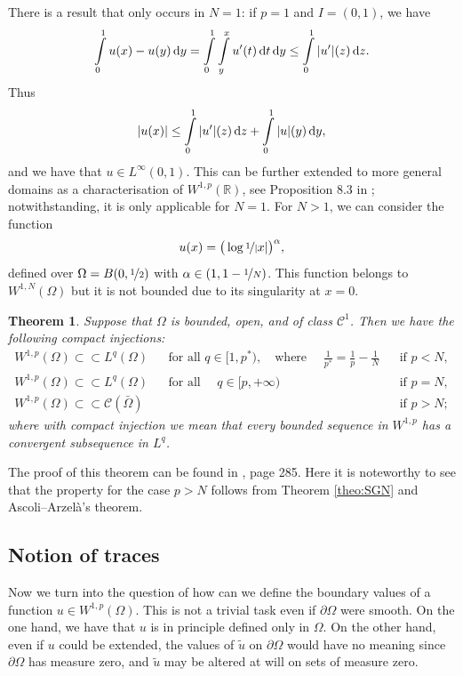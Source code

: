 \documentclass[a4paper,doc,11pt]{article}
\newtheorem{theorem}{Theorem}[section]
\newcommand{\R}{\mathbb{R}}
\newcommand{\CC}{\mathcal{C}}
\begin{document}
There is a result that only occurs in \(N=1\): if \(p=1\) and \( I = (0,1) \), we have
\[
    \int\limits_0^1 u(x) - u(y) \dif y = \int\limits_0^1 \int\limits_y^x u'(t) \dif t \dif y \leq \int\limits_0^1 |u'|(z) \dif z.
\]
Thus 
\[
    |u(x)| \leq \int\limits_0^1 |u'|(z) \dif z + \int\limits_0^1 |u|(y) \dif y,
\]
and we have that \( u \in L^\infty (0,1)\). This can be further extended to more general domains as a characterisation of \( W^{1,p} (\R)\), see Proposition 8.3 in \citep{Brezis2010}; notwithstanding, it is only applicable for \(N=1\). For \(N > 1\), we can consider the function 
\[
    u(x) = \big( \log \nicefrac 1 |x| \big)^\alpha,
\]
defined over \( \Omega = B(0,\nicefrac 1 2)\) with \( \alpha \in (1,1-\nicefrac 1 N)\). This function belongs to \( W^{1,N}(\Omega)\) but it is not bounded due to its singularity at \( x=0\).

\begin{theorem}
    Suppose that \(\Omega\) is bounded, open, and of class \(\CC^1\). Then we have the following compact injections:
    \begin{align}
        W^{1,p} (\Omega) \subset\subset L^{q} (\Omega) && \text{for all } q\in [1,p^*),\quad    \text{where } \quad\frac{1}{p^*} = \frac{1}{p} - \frac{1}{N} && \text{if } p < N,
        \\
        W^{1,p} (\Omega) \subset\subset L^{q} (\Omega) && \text{for all } \quad q \in [p,+\infty) && \text{if } p = N,
        \\
        W^{1,p} (\Omega) \subset\subset \CC  (\bar \Omega) &&  && \text{if } p > N;
    \end{align}
    where with compact injection we mean that every bounded sequence in \(W^{1,p}\) has a convergent subsequence in \(L^q\).
\end{theorem}

The proof of this theorem can be found in \citep{Brezis2010}, page 285. Here it is noteworthy to see that the property for the case \( p > N\) follows from Theorem \ref{theo:SGN} and Ascoli--Arzelà's theorem.


\subsection{Notion of traces}

Now we turn into the question of how can we define the boundary values of a function \(u \in W^{1,p} (\Omega)\). This is not a trivial task even if \( \partial \Omega\) were smooth. On the one hand, we have that \(u\) is in principle defined only in \(\Omega\). On the other hand, even if \(u\) could be extended, the values of \(\tilde u\) on \(\partial \Omega\) would have no meaning since \(\partial \Omega\) has measure zero, and \(\tilde u\) may be altered at will on sets of measure zero.
\end{document}
